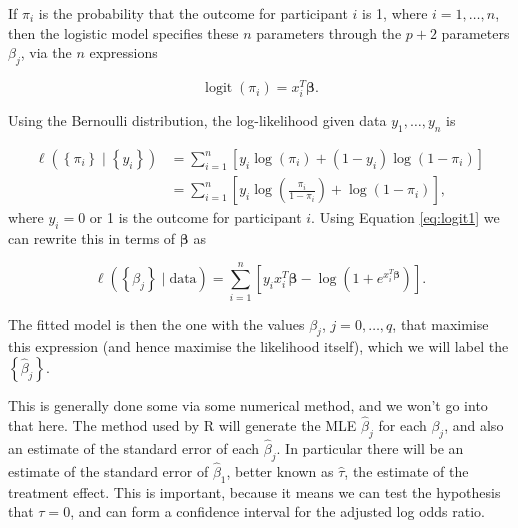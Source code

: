 \documentclass[
  openany]{book}
\theoremstyle{definition}
\theoremstyle{definition}
\theoremstyle{definition}
\theoremstyle{definition}
\theoremstyle{remark}
\begin{document}
If \(\pi_i\) is the probability that the outcome for participant \(i\) is 1, where \(i=1,\ldots,n\), then the logistic model specifies these \(n\) parameters through the \(p+2\) parameters \(\beta_j\), via the \(n\) expressions

\begin{equation}
\operatorname{logit}\left(\pi_i\right) = x_i^T\boldsymbol\beta.
\label{eq:logit1}
\end{equation}

Using the Bernoulli distribution, the log-likelihood given data \(y_1,\ldots,y_n\) is

\begin{align*}
\ell\left(\left\lbrace\pi_i \right\rbrace \mid\left\lbrace y_i\right\rbrace\right) & = \sum\limits_{i=1}^n\left[y_i\log(\pi_i) + \left(1-y_i\right)\log\left(1-\pi_i\right)\right]\\
& = \sum\limits_{i=1}^n\left[y_i\log\left(\frac{\pi_i}{1-\pi_i}\right) + \log\left(1-\pi_i\right)\right],
\end{align*}
where \(y_i=0\) or 1 is the outcome for participant \(i\). Using Equation \eqref{eq:logit1} we can rewrite this in terms of \(\boldsymbol\beta\) as

\[\ell\left(\left\lbrace\beta_j \right\rbrace\mid{\text{data}}\right) = \sum\limits_{i=1}^n \left[y_i x_i^T\boldsymbol\beta - \log\left(1+e^{x_i^T\boldsymbol\beta}\right)\right].\]

The fitted model is then the one with the values \(\beta_j\), \(j=0,\dots,q\), that maximise this expression (and hence maximise the likelihood itself), which we will label the \(\left\lbrace \hat{\beta}_j\right\rbrace\).

This is generally done some via some numerical method, and we won't go into that here. The method used by R will generate the MLE \(\hat\beta_j\) for each \(\beta_j\), and also an estimate of the standard error of each \(\hat\beta_j\). In particular there will be an estimate of the standard error of \(\hat\beta_1\), better known as \(\hat\tau\), the estimate of the treatment effect. This is important, because it means we can test the hypothesis that \(\tau=0\), and can form a confidence interval for the adjusted log odds ratio.
\end{document}
